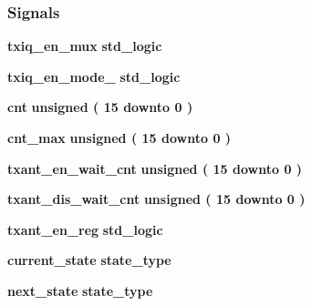 \subsubsection*{Signals}
 \begin{DoxyCompactItemize}
\item 
{\bf txiq\+\_\+en\+\_\+mux} {\bfseries \textcolor{comment}{std\+\_\+logic}\textcolor{vhdlchar}{ }} 
\item 
{\bf txiq\+\_\+en\+\_\+mode\+\_} {\bfseries \textcolor{comment}{std\+\_\+logic}\textcolor{vhdlchar}{ }} 
\item 
{\bf cnt} {\bfseries \textcolor{comment}{unsigned}\textcolor{vhdlchar}{ }\textcolor{vhdlchar}{(}\textcolor{vhdlchar}{ }\textcolor{vhdlchar}{ } \textcolor{vhdldigit}{15} \textcolor{vhdlchar}{ }\textcolor{keywordflow}{downto}\textcolor{vhdlchar}{ }\textcolor{vhdlchar}{ } \textcolor{vhdldigit}{0} \textcolor{vhdlchar}{ }\textcolor{vhdlchar}{)}\textcolor{vhdlchar}{ }} 
\item 
{\bf cnt\+\_\+max} {\bfseries \textcolor{comment}{unsigned}\textcolor{vhdlchar}{ }\textcolor{vhdlchar}{(}\textcolor{vhdlchar}{ }\textcolor{vhdlchar}{ } \textcolor{vhdldigit}{15} \textcolor{vhdlchar}{ }\textcolor{keywordflow}{downto}\textcolor{vhdlchar}{ }\textcolor{vhdlchar}{ } \textcolor{vhdldigit}{0} \textcolor{vhdlchar}{ }\textcolor{vhdlchar}{)}\textcolor{vhdlchar}{ }} 
\item 
{\bf txant\+\_\+en\+\_\+wait\+\_\+cnt} {\bfseries \textcolor{comment}{unsigned}\textcolor{vhdlchar}{ }\textcolor{vhdlchar}{(}\textcolor{vhdlchar}{ }\textcolor{vhdlchar}{ } \textcolor{vhdldigit}{15} \textcolor{vhdlchar}{ }\textcolor{keywordflow}{downto}\textcolor{vhdlchar}{ }\textcolor{vhdlchar}{ } \textcolor{vhdldigit}{0} \textcolor{vhdlchar}{ }\textcolor{vhdlchar}{)}\textcolor{vhdlchar}{ }} 
\item 
{\bf txant\+\_\+dis\+\_\+wait\+\_\+cnt} {\bfseries \textcolor{comment}{unsigned}\textcolor{vhdlchar}{ }\textcolor{vhdlchar}{(}\textcolor{vhdlchar}{ }\textcolor{vhdlchar}{ } \textcolor{vhdldigit}{15} \textcolor{vhdlchar}{ }\textcolor{keywordflow}{downto}\textcolor{vhdlchar}{ }\textcolor{vhdlchar}{ } \textcolor{vhdldigit}{0} \textcolor{vhdlchar}{ }\textcolor{vhdlchar}{)}\textcolor{vhdlchar}{ }} 
\item 
{\bf txant\+\_\+en\+\_\+reg} {\bfseries \textcolor{comment}{std\+\_\+logic}\textcolor{vhdlchar}{ }} 
\item 
{\bf current\+\_\+state} {\bfseries {\bfseries {\bf state\+\_\+type}} \textcolor{vhdlchar}{ }} 
\item 
{\bf next\+\_\+state} {\bfseries {\bfseries {\bf state\+\_\+type}} \textcolor{vhdlchar}{ }} 
\end{DoxyCompactItemize}


